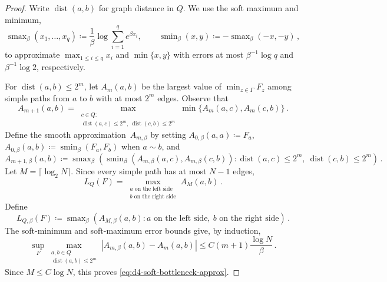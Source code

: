 \documentclass[11pt]{amsart}
\theoremstyle{plain}
\theoremstyle{definition}
\begin{document}
\begin{proof}
	Write $\operatorname{dist}(a,b)$ for graph distance in $Q$. We use the soft maximum and
	minimum, 
	\[
		\operatorname{smax}_\beta(x_1,\ldots,x_q)
		\coloneqq
		\frac1\beta\log\sum_{i=1}^q e^{\beta x_i},
		\qquad
		\operatorname{smin}_\beta(x,y)
		\coloneqq
		-\operatorname{smax}_\beta(-x,-y) \, , 
	\]
	to approximate $\max_{1\leq i\leq q}x_i$ and $\min\{x,y\}$ with errors at
	most $\beta^{-1}\log q$ and $\beta^{-1}\log2$, respectively.

	For $\operatorname{dist}(a,b)\leq2^m$, let $A_m(a,b)$ be the largest value of
	$\min_{z\in\Gamma}F_z$ among simple paths from $a$ to $b$ with at most
	$2^m$ edges. Observe that 
	\[
		A_{m+1}(a,b)=
		\max_{\substack{c\in Q:\\ \operatorname{dist}(a,c)\leq2^m,\ \operatorname{dist}(c,b)\leq2^m}}
		\min\{A_m(a,c),A_m(c,b)\} \, . 
	\]
	Define the smooth approximation~$A_{m,\beta}$ by setting
	$A_{0,\beta}(a,a)\coloneqq F_a$,
	$A_{0,\beta}(a,b)\coloneqq\operatorname{smin}_\beta(F_a,F_b)$ when $a\sim b$, and
	\[
		A_{m+1,\beta}(a,b)\coloneqq
		\operatorname{smax}_\beta\left(
		\operatorname{smin}_\beta(A_{m,\beta}(a,c),A_{m,\beta}(c,b)):
		\operatorname{dist}(a,c)\leq2^m,\ \operatorname{dist}(c,b)\leq2^m\right) \, . 
	\]
	Let $M=\lceil\log_2N\rceil$. Since every simple path has at most $N-1$
	edges,
	\[
		L_Q(F)=
		\max_{\substack{a\text{ on the left side}\\ b\text{ on the right side}}}
		A_M(a,b) \, . 
	\]
	Define
	\[
		L_{Q,\beta}(F)\coloneqq
		\operatorname{smax}_\beta\left(
		A_{M,\beta}(a,b):
		a\text{ on the left side},\ b\text{ on the right side}\right) \, .
	\]
	The soft-minimum and soft-maximum error bounds give, by induction,
	\[
		\sup_F
		\max_{\substack{a,b\in Q\\ \operatorname{dist}(a,b)\leq2^m}}
		|A_{m,\beta}(a,b)-A_m(a,b)|
		\leq C(m+1)\frac{\log N}{\beta}\, .
	\]
	Since $M\leq C\log N$, this proves \eqref{eq:d4-soft-bottleneck-approx}.


\end{proof}
\end{document}
